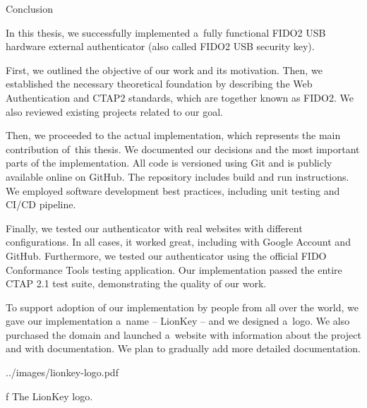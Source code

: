 \chap[conclusion] Conclusion

In this thesis, {\sbf we successfully implemented} a~fully functional FIDO2 USB hardware external authenticator (also called FIDO2 USB security key).

First, we outlined the objective of our work and its motivation. Then, we established the necessary theoretical foundation by describing the Web Authentication and CTAP2 standards, which are together known as FIDO2. We also reviewed existing projects related to our goal.

Then, we proceeded to the actual implementation, which represents the main contribution of~this thesis. We documented our decisions and the most important parts of the implementation. All code is versioned using Git and is publicly {\sbf available online on GitHub}. The repository includes build and run instructions. We employed software development best practices, including unit testing and CI/CD pipeline.

Finally, {\sbf we tested} our authenticator {\sbf with real websites} with different configurations. In all cases, {\sbf it worked great}, including with Google Account and GitHub.
Furthermore, we tested our authenticator using the official FIDO Conformance Tools testing application. Our implementation passed the entire CTAP 2.1 test suite, demonstrating the quality of our work.

To support adoption of our implementation by people from all over the world, we gave our implementation a~name – LionKey – and we designed a~logo. We also purchased the domain  and launched a~website with information about the project and with documentation. We plan to gradually add more detailed documentation.

\midinsert
\picheight=45mm \cinspic ../images/lionkey-logo.pdf
\caption/f The LionKey logo.
\endinsert

